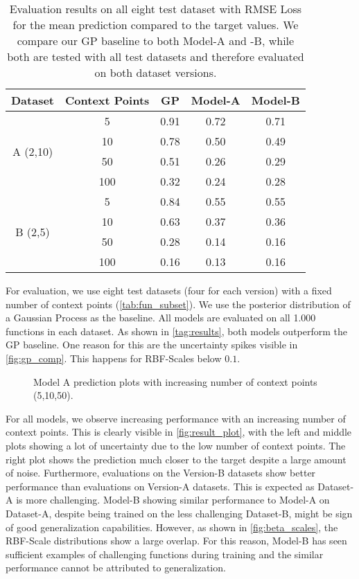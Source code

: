 \begin{table}[]
	\caption{Evaluation results on all eight test dataset with RMSE Loss for the mean prediction compared to the target values. We compare our GP baseline to both Model-A and -B, while both are tested with all test datasets and therefore evaluated on both dataset versions. }
	\begin{tabular}{c c c c c}
		\toprule
		Dataset & Context Points & GP & Model-A & Model-B\\
		\midrule
		\multirow{4}{*}{A (2,10)} & 5 & 0.91 & 0.72 & 0.71\\
		&10& 0.78 & 0.50 & 0.49\\ 
		&50 & 0.51 & 0.26 & 0.29\\
		&100 & 0.32 & 0.24 & 0.28\\\midrule
		\multirow{4}{*}{B (2,5)} & 5 & 0.84 & 0.55 & 0.55\\
		& 10 & 0.63 & 0.37 & 0.36\\
		& 50 & 0.28 & 0.14 & 0.16\\
		& 100 & 0.16 & 0.13 & 0.16\\\bottomrule
	\end{tabular}
	\label{tag:results}
\end{table}


For evaluation, we use eight test datasets (four for each version) with a fixed number of context points (\autoref{tab:fun_subset}). We use the posterior distribution of a Gaussian Process as the baseline. All models are evaluated on all 1.000 functions in each dataset.
As shown in \autoref{tag:results}, both models outperform the GP baseline. One reason for this are the uncertainty spikes visible in \autoref{fig:gp_comp}. This happens for RBF-Scales below $0.1$.

\begin{figure*}[t]
	\centering
	\resizebox{0.9\textwidth}{!}{
		
		
		
	}
	\caption{Model A prediction plots with increasing number of context points (5,10,50).}
	\label{fig:result_plot}
\end{figure*}

For all models, we observe increasing performance with an increasing number of context points. This is clearly visible in \autoref{fig:result_plot}, with the left and middle plots showing a lot of uncertainty due to the low number of context points. The right plot shows the prediction much closer to the target despite a large amount of noise. Furthermore, evaluations on the Version-B datasets show better performance than evaluations on Version-A datasets. This is expected as Dataset-A is more challenging. Model-B showing similar performance to Model-A on Dataset-A, despite being trained on the less challenging Dataset-B, might be sign of good generalization capabilities. However, as shown in \autoref{fig:beta_scales}, the RBF-Scale distributions show a large overlap. For this reason, Model-B has seen sufficient examples of challenging functions during training and the similar performance cannot be attributed to generalization.

